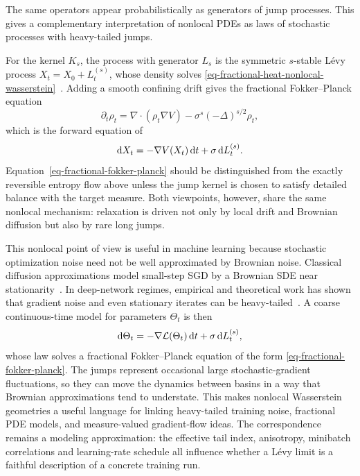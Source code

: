 \begin{rem}
The same operators appear probabilistically as generators of jump processes. This gives a complementary interpretation of nonlocal PDEs as laws of stochastic processes with heavy-tailed jumps.

For the kernel \(K_s\), the process with generator \(L_s\) is the symmetric \(s\)-stable L\'evy process \(X_t=X_0+L_t^{(s)}\), whose density solves \eqref{eq-fractional-heat-nonlocal-wasserstein}~\cite{Applebaum2009Levy}. Adding a smooth confining drift gives the fractional Fokker--Planck equation
\begin{equation}\label{eq-fractional-fokker-planck}
	\partial_t\rho_t
	=
	\nabla\cdot(\rho_t\nabla V)
	-
	\sigma^s(-\Delta)^{s/2}\rho_t,
\end{equation}
which is the forward equation of
\[
	\mathrm{d} X_t=-\nabla V(X_t)\,\mathrm{d} t+\sigma\,\mathrm{d} L_t^{(s)}.
\]
Equation~\eqref{eq-fractional-fokker-planck} should be distinguished from the exactly reversible entropy flow above unless the jump kernel is chosen to satisfy detailed balance with the target measure. Both viewpoints, however, share the same nonlocal mechanism: relaxation is driven not only by local drift and Brownian diffusion but also by rare long jumps.
\end{rem}

\begin{rem}
This nonlocal point of view is useful in machine learning because stochastic optimization noise need not be well approximated by Brownian noise. Classical diffusion approximations model small-step SGD by a Brownian SDE near stationarity~\cite{MandtHoffmanBlei2017SGD}. In deep-network regimes, empirical and theoretical work has shown that gradient noise and even stationary iterates can be heavy-tailed~\cite{SimsekliSagunGurbuzbalaban2019TailIndex,GurbuzbalabanSimsekliZhu2021HeavyTailSGD}. A coarse continuous-time model for parameters \(\Theta_t\) is then
\[
	\mathrm{d}\Theta_t
	=
	-\nabla \mathcal L(\Theta_t)\,\mathrm{d} t
	+
	\sigma\,\mathrm{d} L_t^{(s)},
\]
whose law solves a fractional Fokker--Planck equation of the form \eqref{eq-fractional-fokker-planck}. The jumps represent occasional large stochastic-gradient fluctuations, so they can move the dynamics between basins in a way that Brownian approximations tend to understate. This makes nonlocal Wasserstein geometries a useful language for linking heavy-tailed training noise, fractional PDE models, and measure-valued gradient-flow ideas. The correspondence remains a modeling approximation: the effective tail index, anisotropy, minibatch correlations and learning-rate schedule all influence whether a L\'evy limit is a faithful description of a concrete training run.
\end{rem}

